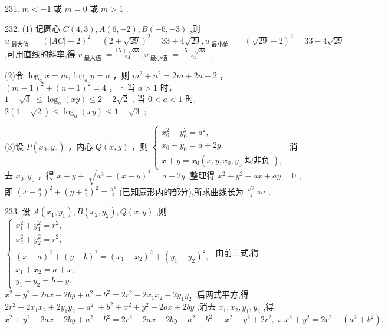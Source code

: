 \documentclass[10pt]{article}
\newcommand*\circled[1]{\tikz[baseline=(char.base)]{\node[shape=circle,draw,inner sep=1.5pt] (char) {\small #1};}}
\begin{document}
231. \(m <  - 1\) 或 \(m = 0\) 或 \(m > 1\) .

232. (1) 记圆心 \(C\left( {4,3}\right) ,A\left( {6, - 2}\right) ,B\left( {-6, - 3}\right)\) ,则 \({u}_{\text{ 最大值 }} = {\left( \left| AC\right|  + 2\right) }^{2} = {\left( 2 + \sqrt{29}\right) }^{2} = {33} + 4\sqrt{29},{u}_{\text{ 最小值 }} = \; {\left( \sqrt{29} - 2\right) }^{2} = {33} - 4\sqrt{29}\) ,可用直线的斜率,得 \({v}_{\text{ 最大值 }} = \frac{{15} + \sqrt{33}}{24},{v}_{\text{ 最小值 }} = \frac{{15} - \sqrt{33}}{24}\) ;

(2)令 \({\log }_{a}x = m,{\log }_{a}y = n\) ，则 \({m}^{2} + {n}^{2} = {2m} + {2n} + 2\) ， \({\left( m - 1\right) }^{2} + {\left( n - 1\right) }^{2} = 4\) ， \(\therefore\)  \circled{1} 当 \(a > 1\) 时， \(1 + \sqrt{3} \; \leq  {\log }_{a}\left( {xy}\right)  \leq  2 + 2\sqrt{2}\) , \circled{2} 当 \(0 < a < 1\) 时, \(2\left( {1 - \sqrt{2}}\right)  \leq  {\log }_{a}\left( {xy}\right)  \leq  1 - \sqrt{3}\) ;

(3)设 \(P\left( {{x}_{0},{y}_{0}}\right)\) ，内心 \(Q\left( {x,y}\right)\) ，则 \(\left\{  \begin{array}{l} {x}_{0}^{2} + {y}_{0}^{2} = {a}^{2}, \\  {x}_{0} + {y}_{0} = a + {2y}, \\  x + y = {x}_{0}\left( {x,y,{x}_{0},{y}_{0}\text{ 均非负 }}\right) , \end{array}\right.\) 消去 \({x}_{0},{y}_{0}\) ，得 \(x + y + \; \sqrt{{a}^{2} - {\left( x + y\right) }^{2}} = a + {2y}\) ,整理得 \({x}^{2} + {y}^{2} - {ax} + {ay} = 0\) ,即 \({\left( x - \frac{a}{2}\right) }^{2} + {\left( y + \frac{a}{2}\right) }^{2} = \frac{{a}^{2}}{2}\) (已知扇形内的部分),所求曲线长为 \(\frac{\sqrt{2}}{4}{\pi a}\) .

233. 设 \(A\left( {{x}_{1},{y}_{1}}\right) ,B\left( {{x}_{2},{y}_{2}}\right) ,Q\left( {x,y}\right)\) ,则 \(\left\{  \begin{array}{l} {x}_{1}^{2} + {y}_{1}^{2} = {r}^{2}, \\  {x}_{2}^{2} + {y}_{2}^{2} = {r}^{2}, \\  {\left( x - a\right) }^{2} + {\left( y - b\right) }^{2} = {\left( {x}_{1} - {x}_{2}\right) }^{2} + {\left( {y}_{1} - {y}_{2}\right) }^{2}, \\  {x}_{1} + {x}_{2} = a + x, \\  {y}_{1} + {y}_{2} = b + y. \end{array}\right.\) 由前三式,得 \({x}^{2} + {y}^{2} - {2ax} - {2by} + {a}^{2} + {b}^{2} = 2{r}^{2} - 2{x}_{1}{x}_{2} - 2{y}_{1}{y}_{2}\) ,后两式平方,得 \(2{r}^{2} + 2{x}_{1}{x}_{2} + 2{y}_{1}{y}_{2} = {a}^{2} \; + {b}^{2} + {x}^{2} + {y}^{2} + {2ax} + {2by}\) ,消去 \({x}_{1},{x}_{2},{y}_{1},{y}_{2}\) ,得 \({x}^{2} + {y}^{2} - {2ax} - {2by} + {a}^{2} + {b}^{2} = 2{r}^{2} - {2ax} - {2by} - {a}^{2} - {b}^{2} \; - {x}^{2} - {y}^{2} + 2{r}^{2},\;\therefore \;{x}^{2} + {y}^{2} = 2{r}^{2} - \left( {{a}^{2} + {b}^{2}}\right) .\)
\end{document}
